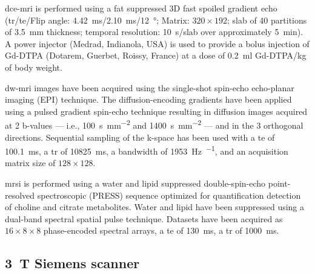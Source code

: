 
\ac{dce}-\ac{mri} is performed using a fat suppressed 3D fast spoiled gradient echo (\ac{tr}/\ac{te}/Flip angle: \SI{4.42}{\ms}/\SI{2.10}{\ms}/\SI{12}{\degree}; Matrix: $320 \times 192$; slab of 40 partitions of \SI{3.5}{\mm} thickness; temporal resolution: \SI{10}{\s}/slab over approximately \SI{5}{\minute}).
A power injector (Medrad, Indianola, USA) is used to provide a bolus injection of Gd-DTPA (Dotarem, Guerbet, Roissy, France) at a dose of \SI{0.2}{\ml} Gd-DTPA/kg of body weight.

\ac{dw}-\ac{mri} images have been acquired using the single-shot spin-echo echo-planar imaging (EPI) technique.
The diffusion-encoding gradients have been applied using a pulsed gradient spin-echo technique resulting in diffusion images acquired at 2 b-values --- i.e., \SI{100}{\second\per\milli\meter\squared} and \SI{1400}{\second\per\milli\meter\squared} --- and in the 3 orthogonal directions.
Sequential sampling of the k-space has been used with a \ac{te} of \SI{100.1}{\ms}, a \ac{tr} of \SI{10825}{\ms}, a bandwidth of \SI{1953}{\hertz\per\px}, and an acquisition matrix size of $128 \times 128$.

\ac{mrsi} is performed using a water and lipid suppressed double-spin-echo point-resolved spectroscopic (PRESS) sequence optimized for quantification detection of choline and citrate metabolites.
Water and lipid have been suppressed using a dual-band spectral spatial pulse technique.
Datasets have been acquired as $16 \times 8 \times 8$ phase-encoded spectral arrays, a \ac{te} of \SI{130}{\ms}, a \ac{tr} of \SI{1000}{\ms}.%

\subsection{\SI{3}{\tesla} Siemens scanner}\label{sec:data3t}

